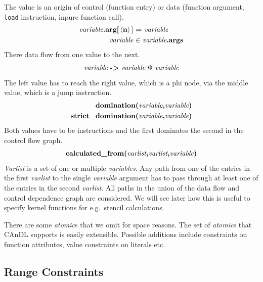     The value is an origin of control (function entry) or data (function argument, {\tt load} instruction, inpure function call).
    \begin{align*}
        \text{\it variable}\text{\bf.arg[}\left<\text{\bf n}\right>{\bf]}\ &\text{\bf =}\ \text{\it variable}\\
        \text{\it variable}\ &\text{\bf $\in$}\ \text{\it variable}\text{\bf .args}
    \end{align*}
    There data flow from one value to the next.
    \begin{align*}
        \text{\it variable}\ \text{\bf ->}\ \text{\it variable}\ \Phi\ \text{\it variable}
    \end{align*}
    The left value has to reach the right value, which is a phi node, via the middle value, which is a jump instruction.
    \begin{align*}
        \text{\bf domination(}\text{\it variable}\text{\bf,} \text{\it variable}\text{\bf)}&\\
        \text{\bf strict\_domination(}\text{\it variable}\text{\bf,} \text{\it variable}\text{\bf)}&
    \end{align*}
    Both values have to be instructions and the first dominates the second in the control flow graph.
    \begin{align*}
        \text{\bf calculated\_from(}\text{\it varlist}\text{\bf,}\text{\it varlist}\text{\bf,}\text{\it variable}\text{\bf)}
    \end{align*}
    {\it Varlist} is a set of one or multiple {\it variables}.
    Any path from one of the entries in the first {\it varlist} to the single
    {\it variable} argument has to pass through at least one of the entries in
    the second {\it varlist}.
    All paths in the union of the data flow and control dependence graph are
    considered.
    We will see later how this is useful to specify kernel functions for
    e.g.\ stencil calculations.

    There are some {\it atomic}s that we omit for space reasons.
    The set of {\it atomic}s that CAnDL supports is easily extensible.
    Possible additions include constraints on function attributes, value
    constraints on literals etc.

\subsection{Range Constraints}

